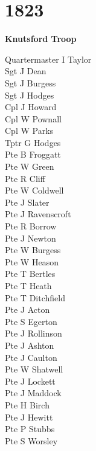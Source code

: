 \chapter*{1823}

\vspace*{10mm}

\begin{center}
  \Large
  \textbf{Knutsford Troop}
\end{center}

\vspace*{10mm}

\begin{multicols}{3}
  \small
  \noindent
  Quartermaster I Taylor \\
  Sgt J Dean \\
  Sgt J Burgess \\
  Sgt J Hodges \\
  Cpl J Howard \\
  Cpl W Pownall \\
  Cpl W Parks \\
  Tptr G Hodges \\
  Pte B Froggatt \\
  Pte W Green \\
  Pte R Cliff \\
  Pte W Coldwell \\
  Pte J Slater \\
  Pte J Ravenscroft \\
  Pte R Borrow \\
  Pte J Newton \\
  Pte W Burgess \\
  Pte W Heason \\
  Pte T Bertles \\
  Pte T Heath \\
  Pte T Ditchfield \\
  Pte J Acton \\
  Pte S Egerton \\
  Pte J Rollinson \\
  Pte J Ashton \\
  Pte J Caulton \\
  Pte W Shatwell \\
  Pte J Lockett \\
  Pte J Maddock \\
  Pte H Birch \\
  Pte J Hewitt \\
  Pte P Stubbs \\
  Pte S Worsley \\

\end{multicols}
